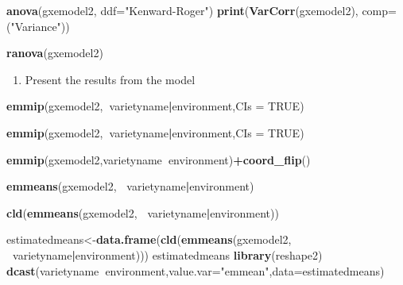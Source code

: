 \documentclass[]{book}
\newenvironment{Shaded}{\begin{snugshade}}{\end{snugshade}}
\newcommand{\KeywordTok}[1]{\textcolor[rgb]{0.13,0.29,0.53}{\textbf{#1}}}
\newcommand{\DataTypeTok}[1]{\textcolor[rgb]{0.13,0.29,0.53}{#1}}
\newcommand{\StringTok}[1]{\textcolor[rgb]{0.31,0.60,0.02}{#1}}
\newcommand{\OtherTok}[1]{\textcolor[rgb]{0.56,0.35,0.01}{#1}}
\newcommand{\OperatorTok}[1]{\textcolor[rgb]{0.81,0.36,0.00}{\textbf{#1}}}
\newcommand{\NormalTok}[1]{#1}
\providecommand{\tightlist}{%
  \setlength{\itemsep}{0pt}\setlength{\parskip}{0pt}}
\theoremstyle{definition}
\theoremstyle{definition}
\theoremstyle{definition}
\theoremstyle{remark}
\begin{document}
\begin{Shaded}
\begin{Highlighting}[]
\KeywordTok{anova}\NormalTok{(gxemodel2, }\DataTypeTok{ddf=}\StringTok{"Kenward-Roger"}\NormalTok{)}
\KeywordTok{print}\NormalTok{(}\KeywordTok{VarCorr}\NormalTok{(gxemodel2), }\DataTypeTok{comp=}\NormalTok{(}\StringTok{"Variance"}\NormalTok{))}

\KeywordTok{ranova}\NormalTok{(gxemodel2)}
\end{Highlighting}
\end{Shaded}

\begin{enumerate}
\def\labelenumi{\arabic{enumi}.}
\setcounter{enumi}{7}
\tightlist
\item
  Present the results from the model
\end{enumerate}

\begin{Shaded}
\begin{Highlighting}[]
\KeywordTok{emmip}\NormalTok{(gxemodel2,}\OperatorTok{~}\NormalTok{varietyname}\OperatorTok{|}\NormalTok{environment,}\DataTypeTok{CIs =} \OtherTok{TRUE}\NormalTok{)}

\KeywordTok{emmip}\NormalTok{(gxemodel2,}\OperatorTok{~}\NormalTok{varietyname}\OperatorTok{|}\NormalTok{environment,}\DataTypeTok{CIs =} \OtherTok{TRUE}\NormalTok{)}


\KeywordTok{emmip}\NormalTok{(gxemodel2,varietyname}\OperatorTok{~}\NormalTok{environment)}\OperatorTok{+}\KeywordTok{coord_flip}\NormalTok{()}

\KeywordTok{emmeans}\NormalTok{(gxemodel2, }\OperatorTok{~}\NormalTok{varietyname}\OperatorTok{|}\NormalTok{environment)}

\KeywordTok{cld}\NormalTok{(}\KeywordTok{emmeans}\NormalTok{(gxemodel2, }\OperatorTok{~}\NormalTok{varietyname}\OperatorTok{|}\NormalTok{environment))}

\NormalTok{estimatedmeans<-}\KeywordTok{data.frame}\NormalTok{(}\KeywordTok{cld}\NormalTok{(}\KeywordTok{emmeans}\NormalTok{(gxemodel2, }\OperatorTok{~}\NormalTok{varietyname}\OperatorTok{|}\NormalTok{environment)))}
\NormalTok{estimatedmeans}
\KeywordTok{library}\NormalTok{(reshape2)}
\KeywordTok{dcast}\NormalTok{(varietyname}\OperatorTok{~}\NormalTok{environment,}\DataTypeTok{value.var=}\StringTok{"emmean"}\NormalTok{,}\DataTypeTok{data=}\NormalTok{estimatedmeans)}
\end{Highlighting}
\end{Shaded}
\end{document}
